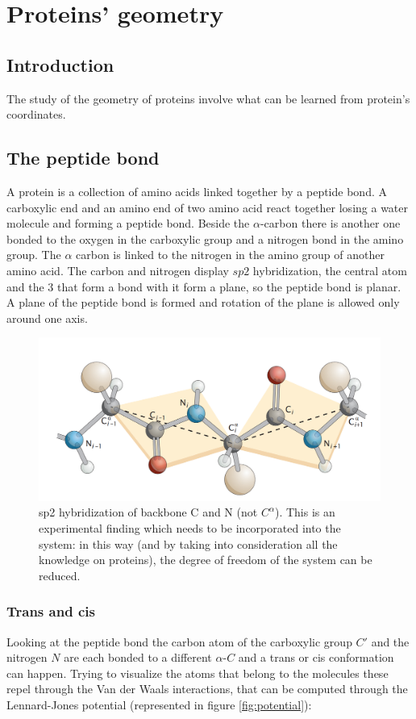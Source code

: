 \graphicspath{{chapters/02/images/}}
\chapter{Proteins' geometry}

\section{Introduction}
The study of the geometry of proteins involve what can be learned from protein's coordinates.

\section{The peptide bond}
A protein is a collection of amino acids linked together by a peptide bond.
A carboxylic end and an amino end of two amino acid react together losing a water molecule and forming a peptide bond.
Beside the $\alpha$-carbon there is another one bonded to the oxygen in the carboxylic group and a nitrogen bond in the amino group.
The $\alpha$ carbon is linked to the nitrogen in the amino group of another amino acid.
The carbon and nitrogen display $sp2$ hybridization, the central atom and the $3$ that form a bond with it form a plane, so the peptide bond is planar.
A plane of the peptide bond is formed and rotation of the plane is allowed only around one axis.
\begin{figure}[H]
			\centering
			\includegraphics[width=\textwidth]{planar.png}
			\caption{sp2 hybridization of backbone C and N (not $C^{\alpha}$). This is an experimental finding which needs to be incorporated into the system: in this way (and by taking into consideration all the knowledge on proteins), the degree of freedom of the system can be reduced.}
			\label{fig:planar}
			\end{figure}

	\subsection{Trans and cis}
	Looking at the peptide bond the carbon atom of the carboxylic group $C'$ and the nitrogen $N$ are each bonded to a different $\alpha$-$C$ and a trans or cis conformation can happen.
	Trying to visualize the atoms that belong to the molecules these repel through the Van der Waals interactions, that can be computed through the Lennard-Jones potential (represented in figure \ref{fig:potential}):

